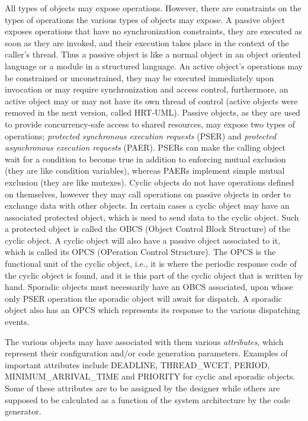 All types of objects may expose operations. However, there are
constraints on the types of operations the various types of objects
may expose. A passive object exposes operations that have no
synchronization constraints, they are executed as soon as they are
invoked, and their execution takes place in the context of the
caller's thread. Thus a passive object is like a normal object in an
object oriented language or a module in a structured language. An
active object's operations may be constrained or unconstrained, they
may be executed immediately upon invocation or may require
synchronization and access control, furthermore, an active object may
or may not have its own thread of control (active objects were removed
in the next version, called HRT-UML). Passive objects, as they are
used to provide concurrency-safe access to shared resources, may
expose two types of operations; \emph{protected synchronous execution
  requests} (PSER) and \emph{protected asynchronous execution
  requests} (PAER). PSERs can make the calling object wait for a
condition to become true in addition to enforcing mutual exclusion
(they are like condition variables), whereas PAERs implement simple
mutual exclusion (they are like mutexes). Cyclic objects do not have
operations defined on themselves, however they may call operations on
passive objects in order to exchange data with other objects. In
certain cases a cyclic object may have an associated protected object,
which is used to send data to the cyclic object. Such a protected
object is called the OBCS (Object Control Block Structure) of the
cyclic object. A cyclic object will also have a passive object
associated to it, which is called its OPCS (OPeration Control
Structure). The OPCS is the functional unit of the cyclic object,
i.e., it is where the periodic response code of the cyclic object is
found, and it is this part of the cyclic object that is written by
hand. Sporadic objects must necessarily have an OBCS associated, upon
whose only PSER operation the sporadic object will await for
dispatch. A sporadic object also has an OPCS which represents its
response to the various dispatching events.

The various objects may have associated with them various
\emph{attributes}, which represent their configuration and/or code
generation parameters. Examples of important attributes include
DEADLINE, THREAD\_WCET, PERIOD, MINIMUM\_ARRIVAL\_TIME and PRIORITY
for cyclic and sporadic objects. Some of these attributes are to be
assigned by the designer while others are supposed to be calculated as
a function of the system architecture by the code generator.


